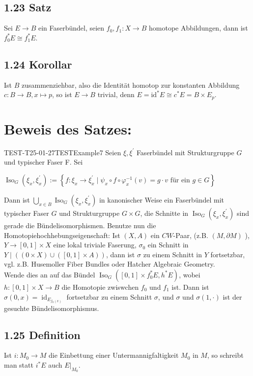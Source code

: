 \subsection*{1.23 Satz}
Sei $E \rightarrow B$ ein Faserbündel, seien $f_{0}, f_{1}: X \rightarrow B$ homotope Abbildungen, dann ist $f_{0}^{*} E \cong f_{1}^{*} E$.

\subsection*{1.24 Korollar}
Ist $B$ zusammenziehbar, also die Identität homotop zur konstanten Abbildung $c: B \rightarrow B, x \mapsto p$, so ist $E \rightarrow B$ trivial, denn $E=\mathrm{id}^{*} E \cong c^{*} E=B \times E_{p}$.

\section*{Beweis des Satzes:}
\begin{EXA}{TEST-T25-01-27}{TESTExample7}
Seien $\xi, \xi^{\prime}$ Faserbündel mit Strukturgruppe $G$ und typischer Faser F. Sei

$
\operatorname{Iso}_{G}\left(\xi_{x}, \xi_{x}^{\prime}\right):=\left\{f: \xi_{x} \rightarrow \xi_{x}^{\prime} \mid \psi_{x} \circ f \circ \varphi_{x}^{-1}(v)=g \cdot v \text { für ein } g \in G\right\}
$
\end{EXA}

Dann ist $\bigcup_{x \in B} \operatorname{Iso}_{G}\left(\xi_{x}, \xi_{x}^{\prime}\right)$ in kanonischer Weise ein Faserbündel mit typischer Faser $G$ und Strukturgruppe $G \times G$, die Schnitte in $\operatorname{Iso}_{G}\left(\xi_{x}, \xi_{x}^{\prime}\right)$ sind gerade die Bündelisomorphismen. Benutze nun die Homotopiehochhebungseigenschaft: Ist $(X, A)$ ein $C W$-Paar, (z.B. $(M, \partial M)$ ), $Y \rightarrow[0,1] \times X$ eine lokal triviale Faserung, $\sigma_{0}$ ein Schnitt in $Y \mid((0 \times X) \cup([0,1] \times A))$, dann ist $\sigma$ zu einem Schnitt in $Y$ fortsetzbar, vgl. z.B. Husemoller Fiber Bundles oder Hatcher Algebraic Geometry.\\
Wende dies an auf das Bündel $\operatorname{Iso}_{G}\left([0,1] \times f_{0}^{*} E, h^{*} E\right)$, wobei $h:[0,1] \times X \rightarrow B$ die Homotopie zwiswchen $f_{0}$ und $f_{1}$ ist. Dann ist $\sigma(0, x)=\operatorname{id}_{E_{f_{0}(x)}}$ fortsetzbar zu einem Schnitt $\sigma$, und $\sigma$ und $\sigma(1, \cdot)$ ist der gesuchte Bündelisomorphismus.

\subsection*{1.25 Definition}
Ist $i: M_{0} \rightarrow M$ die Einbettung einer Untermannigfaltigkeit $M_{0}$ in $M$, so schreibt man statt $i^{*} E$ auch $\left.E\right|_{M_{0}}$.

